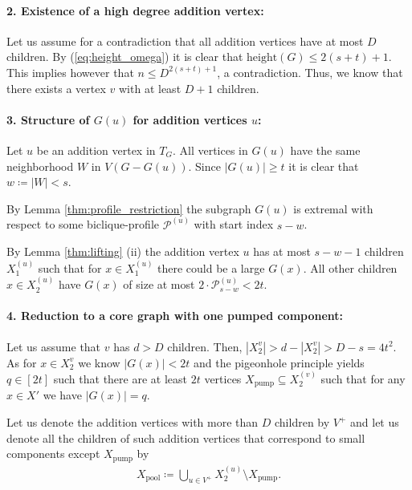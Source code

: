 \documentclass{article}
\theoremstyle{definition}
\theoremstyle{definition}
\theoremstyle{definition}
\theoremstyle{definition}
\theoremstyle{definition}
\theoremstyle{definition}
\theoremstyle{definition}
\theoremstyle{definition}
\theoremstyle{definition}
\theoremstyle{definition}
\begin{document}
    \paragraph{2. Existence of a high degree addition vertex:}
    Let us assume for a contradiction that all addition vertices have at most $D$ children. By (\ref{eq:height_omega}) it is clear that $\text{height}(G) \leq 2(s+t) + 1$. This implies however that $n \leq D ^ {2(s+t) + 1}$, a contradiction.
    Thus, we know that there exists a vertex $v$ with at least $D+1$ children.
    
    \paragraph{3. Structure of $G(u)$ for addition vertices $u$:}
    Let $u$ be an addition vertex in $T_G$.
    All vertices in $G(u)$ have the same neighborhood $W$ in $V\left(G - G(u)\right)$. Since $|G(u)| \geq t$ it is clear that $w \coloneqq |W| < s$.
        
    By Lemma \ref{thm:profile_restriction} the subgraph $G(u)$ is extremal with respect to some biclique-profile $\mathscr{P}^{(u)}$ with start index $s-w$.
    
    By Lemma \ref{thm:lifting} (ii) the addition vertex $u$ has at most $s-w-1$ children $X^{(u)}_1$ such that for $x \in X^{(u)}_1$ there could be a large $G(x)$. All other children $x \in X^{(u)}_2$ have $G(x)$ of size at most $2 \cdot \mathscr{P}^{(u)}_{s-w} < 2t$.

    \paragraph{4. Reduction to a core graph with one pumped component:}
    Let us assume that $v$ has $d > D$ children. Then, $|X^{v}_2| > d - |X^{v}_2| > D - s = 4t^2$.
    As for $x \in X^{v}_2$ we know $|G(x)| < 2t$ and the pigeonhole principle yields $q \in [2t]$ such that there are at least $2t$ vertices $X_{\text{pump}} \subseteq X^{(v)}_2$ such that for any $x \in X'$ we have $|G(x)| = q$.
    
    Let us denote the addition vertices with more than $D$ children by $V^+$ and let us denote all the children of such addition vertices that correspond to small components except $X_{\text{pump}}$ by
    \begin{align}
        X_{\text{pool}} \coloneqq \bigcup_{u \in V^+} X^{(u)}_2 \setminus X_{\text{pump}}.
    \end{align}
\end{document}
